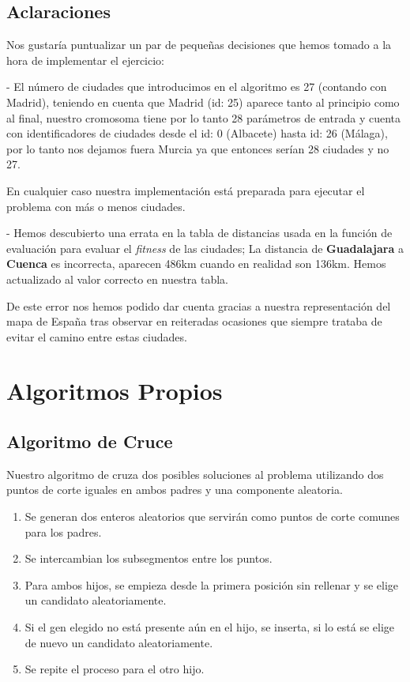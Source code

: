 \documentclass{article}
\begin{document}
\subsection{Aclaraciones}
Nos gustaría puntualizar un par de pequeñas decisiones que hemos tomado a la hora de implementar el ejercicio:\par
\bigskip
\quad- El número de ciudades que introducimos en el algoritmo es 27 (contando con Madrid), teniendo en cuenta que Madrid (id: 25) aparece tanto al principio como al final, nuestro cromosoma tiene por lo tanto 28 parámetros de entrada y cuenta con identificadores de ciudades desde el id: 0 (Albacete) hasta id: 26 (Málaga), por lo tanto nos dejamos fuera Murcia ya que entonces serían 28 ciudades y no 27.\par En cualquier caso nuestra implementación está preparada para ejecutar el problema con más o menos ciudades.\par
\bigskip
\quad- Hemos descubierto una errata en la tabla de distancias usada en la función de evaluación para evaluar el \emph{fitness} de las ciudades;  La distancia de \textbf{Guadalajara} a \textbf{Cuenca} es incorrecta, aparecen 486km cuando en realidad son 136km. Hemos actualizado al valor correcto en nuestra tabla. \par De este error nos hemos podido dar cuenta gracias a nuestra representación del mapa de España tras observar en reiteradas ocasiones que siempre trataba de evitar el camino entre estas ciudades.

\newpage

\section{Algoritmos Propios}

\subsection{Algoritmo de Cruce}
Nuestro algoritmo de cruza dos posibles soluciones al problema utilizando dos puntos de corte iguales en ambos padres y una componente aleatoria.
\begin{enumerate}
	\item Se generan dos enteros aleatorios que servirán como puntos de corte comunes para los padres.
	\item Se intercambian los subsegmentos entre los puntos.
	\item Para ambos hijos, se empieza desde la primera posición sin rellenar y se elige un candidato aleatoriamente.
	\item Si el gen elegido no está presente aún en el hijo, se inserta, si lo está se elige de nuevo un candidato aleatoriamente.
	\item Se repite el proceso para el otro hijo.
\end{enumerate}
\end{document}
